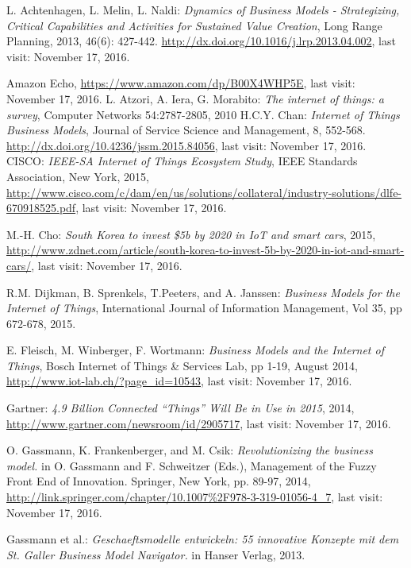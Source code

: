  \begin{thebibliography}{99}
	 L. Achtenhagen, L. Melin, L. Naldi: \emph{Dynamics of Business Models - Strategizing, Critical Capabilities and Activities for Sustained Value Creation}, Long Range Planning, 2013, 46(6): 427-442. \url{http://dx.doi.org/10.1016/j.lrp.2013.04.002},  last visit: November 17, 2016.
 
 	 Amazon Echo, \url{https://www.amazon.com/dp/B00X4WHP5E}, last visit: November 17, 2016.
	 L. Atzori, A. Iera, G. Morabito: \emph{The internet of things: a survey}, Computer Networks 54:2787-2805, 2010 
	 H.C.Y. Chan: \emph{Internet of Things Business Models}, Journal of Service Science and Management, 8, 552-568. \url{http://dx.doi.org/10.4236/jssm.2015.84056}, last visit: November 17, 2016.
	 CISCO: \emph{IEEE-SA Internet of Things Ecosystem Study}, IEEE Standards Association, New York, 2015, \url{http://www.cisco.com/c/dam/en/us/solutions/collateral/industry-solutions/dlfe-670918525.pdf}, last visit: November 17, 2016.

	 M.-H. Cho: \emph{South Korea to invest \$5b by 2020 in IoT and smart cars}, 2015, \url{http://www.zdnet.com/article/south-korea-to-invest-5b-by-2020-in-iot-and-smart-cars/}, last visit: November 17, 2016.

	 R.M. Dijkman, B. Sprenkels, T.Peeters, and A. Janssen: \emph{Business Models for the Internet of Things}, International Journal of Information Management, Vol 35, pp 672-678, 2015.

	 E. Fleisch, M. Winberger, F. Wortmann: \emph{Business Models and the Internet of Things}, Bosch Internet of Things \& Services Lab, pp 1-19, August 2014, \url{http://www.iot-lab.ch/?page_id=10543}, last visit: November 17, 2016.

 	 Gartner: \emph{4.9 Billion Connected ``Things'' Will Be in Use in 2015}, 2014, \url{http://www.gartner.com/newsroom/id/2905717}, last visit: November 17, 2016.
	
	 O. Gassmann, K. Frankenberger, and M. Csik: \emph{Revolutionizing the business model.} in O. Gassmann and F. Schweitzer (Eds.), Management of the Fuzzy Front End of Innovation. Springer, New York, pp. 89-97, 2014, \url{http://link.springer.com/chapter/10.1007%2F978-3-319-01056-4_7}, last visit: November 17, 2016.

	 Gassmann et al.: \emph{Geschaeftsmodelle entwickeln: 55 innovative Konzepte mit dem St. Galler Business Model Navigator.} in Hanser Verlag, 2013.


\end{thebibliography}
